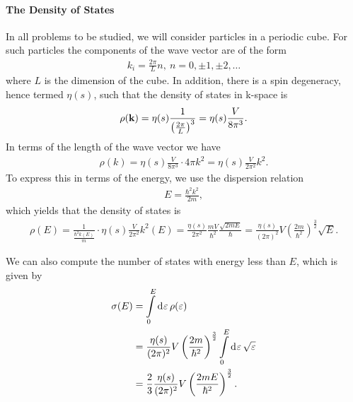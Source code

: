 \paragraph{The Density of States}
In all problems to be studied, we will consider particles in a periodic cube. For such particles the components of the wave vector are of the form
\begin{align*}
	k_{i} = \frac{2\pi}{L}n,\ n = 0, \pm 1, \pm 2, \dots
\end{align*}
where $L$ is the dimension of the cube. In addition, there is a spin degeneracy, hence termed $\eta(s)$, such that the density of states in k-space is
\begin{align*}
	\rho(\vb{k}) = \eta(s)\frac{1}{\left(\frac{2\pi}{L}\right)^{3}} = \eta(s)\frac{V}{8\pi^{3}}.
\end{align*}
In terms of the length of the wave vector we have
\begin{align*}
	\rho(k) = \eta(s)\frac{V}{8\pi^{3}}\cdot 4\pi k^{2} = \eta(s)\frac{V}{2\pi^{2}}k^{2}.
\end{align*}
To express this in terms of the energy, we use the dispersion relation
\begin{align*}
E = \frac{\hbar^{2}k^{2}}{2m},
\end{align*}
which yields that the density of states is
\begin{align*}
\rho(E) = \frac{1}{\frac{\hbar^{2}k(E)}{m}}\cdot \eta(s)\frac{V}{2\pi^{2}}k^{2}(E) = \frac{\eta(s)}{2\pi^{2}}\frac{mV}{\hbar^{2}}\frac{\sqrt{2mE}}{\hbar} = \frac{\eta(s)}{(2\pi)^{2}}V\left(\frac{2m}{\hbar^{2}}\right)^{\frac{3}{2}}\sqrt{E}.
\end{align*}

We can also compute the number of states with energy less than $E$, which is given by
\begin{align*}
\sigma(E) &= \int\limits_{0}^{E}\dd[]{\varepsilon}\rho(\varepsilon) \\
          &= \frac{\eta(s)}{(2\pi)^{2}}V\left(\frac{2m}{\hbar^{2}}\right)^{\frac{3}{2}}\int\limits_{0}^{E}\dd[]{\varepsilon}\sqrt{\varepsilon} \\
          &= \frac{2}{3}\frac{\eta(s)}{(2\pi)^{2}}V\left(\frac{2mE}{\hbar^{2}}\right)^{\frac{3}{2}}.
\end{align*}

